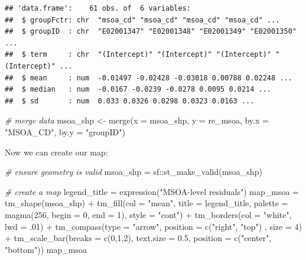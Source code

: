 \documentclass[
]{book}
\newenvironment{Shaded}{\begin{snugshade}}{\end{snugshade}}
\newcommand{\AttributeTok}[1]{\textcolor[rgb]{0.77,0.63,0.00}{#1}}
\newcommand{\CommentTok}[1]{\textcolor[rgb]{0.56,0.35,0.01}{\textit{#1}}}
\newcommand{\DecValTok}[1]{\textcolor[rgb]{0.00,0.00,0.81}{#1}}
\newcommand{\FloatTok}[1]{\textcolor[rgb]{0.00,0.00,0.81}{#1}}
\newcommand{\FunctionTok}[1]{\textcolor[rgb]{0.00,0.00,0.00}{#1}}
\newcommand{\NormalTok}[1]{#1}
\newcommand{\OtherTok}[1]{\textcolor[rgb]{0.56,0.35,0.01}{#1}}
\newcommand{\SpecialCharTok}[1]{\textcolor[rgb]{0.00,0.00,0.00}{#1}}
\newcommand{\StringTok}[1]{\textcolor[rgb]{0.31,0.60,0.02}{#1}}
\begin{document}
\begin{verbatim}
## 'data.frame':    61 obs. of  6 variables:
##  $ groupFctr: chr  "msoa_cd" "msoa_cd" "msoa_cd" "msoa_cd" ...
##  $ groupID  : chr  "E02001347" "E02001348" "E02001349" "E02001350" ...
##  $ term     : chr  "(Intercept)" "(Intercept)" "(Intercept)" "(Intercept)" ...
##  $ mean     : num  -0.01497 -0.02428 -0.03018 0.00788 0.02248 ...
##  $ median   : num  -0.0167 -0.0239 -0.0278 0.0095 0.0214 ...
##  $ sd       : num  0.033 0.0326 0.0298 0.0323 0.0163 ...
\end{verbatim}

\begin{Shaded}
\begin{Highlighting}[]
\CommentTok{\# merge data}
\NormalTok{msoa\_shp }\OtherTok{\textless{}{-}} \FunctionTok{merge}\NormalTok{(}\AttributeTok{x =}\NormalTok{ msoa\_shp, }\AttributeTok{y =}\NormalTok{ re\_msoa, }\AttributeTok{by.x =} \StringTok{"MSOA\_CD"}\NormalTok{, }\AttributeTok{by.y =} \StringTok{"groupID"}\NormalTok{)}
\end{Highlighting}
\end{Shaded}

Now we can create our map:

\begin{Shaded}
\begin{Highlighting}[]
\CommentTok{\# ensure geometry is valid}
\NormalTok{msoa\_shp }\OtherTok{=}\NormalTok{ sf}\SpecialCharTok{::}\FunctionTok{st\_make\_valid}\NormalTok{(msoa\_shp)}

\CommentTok{\# create a map}
\NormalTok{legend\_title }\OtherTok{=} \FunctionTok{expression}\NormalTok{(}\StringTok{"MSOA{-}level residuals"}\NormalTok{)}
\NormalTok{map\_msoa }\OtherTok{=} \FunctionTok{tm\_shape}\NormalTok{(msoa\_shp) }\SpecialCharTok{+}
  \FunctionTok{tm\_fill}\NormalTok{(}\AttributeTok{col =} \StringTok{"mean"}\NormalTok{, }\AttributeTok{title =}\NormalTok{ legend\_title, }\AttributeTok{palette =} \FunctionTok{magma}\NormalTok{(}\DecValTok{256}\NormalTok{, }\AttributeTok{begin =} \DecValTok{0}\NormalTok{, }\AttributeTok{end =} \DecValTok{1}\NormalTok{), }\AttributeTok{style =} \StringTok{"cont"}\NormalTok{) }\SpecialCharTok{+} 
  \FunctionTok{tm\_borders}\NormalTok{(}\AttributeTok{col =} \StringTok{"white"}\NormalTok{, }\AttributeTok{lwd =}\NormalTok{ .}\DecValTok{01}\NormalTok{)  }\SpecialCharTok{+} 
  \FunctionTok{tm\_compass}\NormalTok{(}\AttributeTok{type =} \StringTok{"arrow"}\NormalTok{, }\AttributeTok{position =} \FunctionTok{c}\NormalTok{(}\StringTok{"right"}\NormalTok{, }\StringTok{"top"}\NormalTok{) , }\AttributeTok{size =} \DecValTok{4}\NormalTok{) }\SpecialCharTok{+} 
  \FunctionTok{tm\_scale\_bar}\NormalTok{(}\AttributeTok{breaks =} \FunctionTok{c}\NormalTok{(}\DecValTok{0}\NormalTok{,}\DecValTok{1}\NormalTok{,}\DecValTok{2}\NormalTok{), }\AttributeTok{text.size =} \FloatTok{0.5}\NormalTok{, }\AttributeTok{position =}  \FunctionTok{c}\NormalTok{(}\StringTok{"center"}\NormalTok{, }\StringTok{"bottom"}\NormalTok{)) }
\NormalTok{map\_msoa}
\end{Highlighting}
\end{Shaded}
\end{document}
